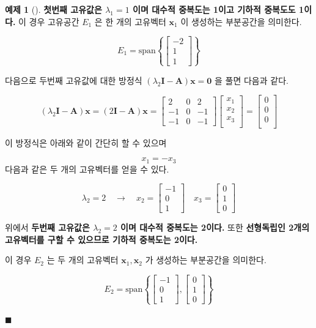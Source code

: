 \documentclass[
  11pt,
  a4paper,
  oneside]{scrbook}
\theoremstyle{definition}
\theoremstyle{definition}
\newtheorem{exercise}{예제}[chapter]
\theoremstyle{plain}
\theoremstyle{remark}
\begin{document}
\begin{exercise}[]
\textbf{첫번째 고유값은 \(\lambda_1=1\) 이며 대수적 중복도는 1이고
기하적 중복도도 1이다.} 이 경우 고유공간 \(E_1\) 은 한 개의 고유벡터
\(\pmb x_1\) 이 생성하는 부분공간을 의미한다.

\[
E_1 = \text{span}\left\{\begin{bmatrix}-2 \\ 1 \\ 1\end{bmatrix} \right\}
\]

다음으로 두번째 고유값에 대한 방정식
\((\lambda_2 \pmb I -\pmb A )\pmb x = \pmb 0\) 을 풀면 다음과 같다.

\[
(\lambda_2 \pmb I -\pmb A )\pmb x= (2\pmb I -\pmb A )\pmb x =
\begin{bmatrix}
2 & 0 & 2 \\
-1 & 0 & -1 \\
-1 & 0 & -1
\end{bmatrix}
\begin{bmatrix}
x_1 \\
x_2 \\
x_3 \\
\end{bmatrix}
=
\begin{bmatrix}
0 \\
0 \\
0 \\
\end{bmatrix}
\]

이 방정식은 아래와 같이 간단히 할 수 있으며

\[ x_1 = -x_3 \] 다음과 같은 두 개의 고유벡터를 얻을 수 있다.

\[ 
\lambda_2=2\quad \rightarrow \quad  x_2=\begin{bmatrix}-1 \\ 0 \\ 1\end{bmatrix} 
\quad x_3=\begin{bmatrix}0 \\ 1 \\ 0\end{bmatrix} 
\]

위에서 \textbf{두번째 고유값은 \(\lambda_2=2\) 이며 대수적 중복도는
2이다.} 또한 \textbf{선형독립인 2개의 고유벡터를 구할 수 있으므로 기하적
중복도는 2이다.}

이 경우 \(E_2\) 는 두 개의 고유벡터 \(\pmb x_1, \pmb x_2\) 가 생성하는
부분공간을 의미한다.

\[
E_2 = \text{span}\left\{\begin{bmatrix}-1 \\ 0 \\ 1\end{bmatrix}, \begin{bmatrix}0 \\ 1 \\ 0\end{bmatrix}\right\}
\]

\(\blacksquare\)

\end{exercise}
\end{document}
